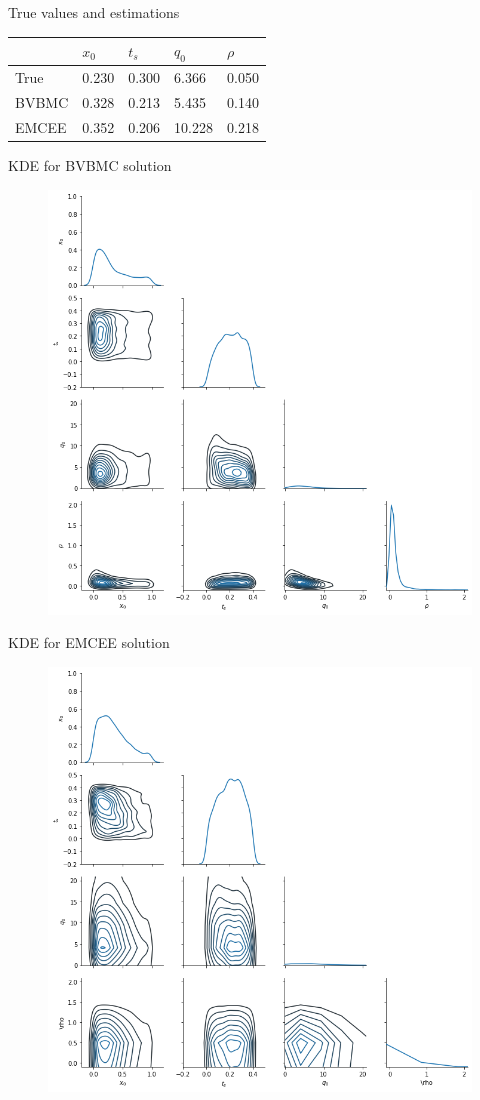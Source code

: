 \documentclass{beamer}
\begin{document}
\begin{frame}
\begin{block}{True values and estimations}
\begin{table}[h]
	\centering
	\begin{tabular}{l|l|l|l|l|}
		\cline{2-5}
		& $x_0$ & $t_s$ & $q_0$  & $\rho$ \\ \hline
		\multicolumn{1}{|l|}{True}  & 0.230 & 0.300 & 6.366  & 0.050  \\ \hline
		\multicolumn{1}{|l|}{BVBMC} & 0.328 & 0.213 & 5.435  & 0.140  \\ \hline
		\multicolumn{1}{|l|}{EMCEE} & 0.352 & 0.206 & 10.228 & 0.218  \\ \hline
	\end{tabular}
\end{table}
\end{block}
\end{frame}
\begin{frame}
\begin{block}{KDE for BVBMC solution}
\begin{figure}
	\centering
	\includegraphics[width=0.6\linewidth]{figs/sourceproblemhistogramsvb.png}
\end{figure}
\end{block}
\end{frame}
\begin{frame}
\begin{block}{KDE for EMCEE solution}
	\begin{figure}
		\centering
		\includegraphics[width=0.6\linewidth]{figs/sourceproblemhistogramsemcee.png}
	\end{figure}
\end{block}
\end{frame}
\end{document}
